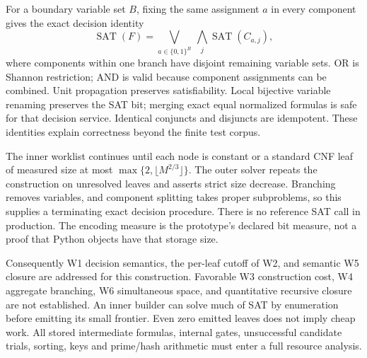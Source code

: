 \documentclass[11pt]{article}
\begin{document}
For a boundary variable set $B$, fixing the same assignment $a$ in every component
gives the exact decision identity
\[
\operatorname{SAT}(F)=
\bigvee_{a\in\{0,1\}^{B}}\ \bigwedge_j
\operatorname{SAT}(C_{a,j}),
\]
where components within one branch have disjoint remaining variable sets.
OR is Shannon restriction; AND is valid because component assignments can be
combined. Unit propagation preserves satisfiability. Local bijective variable
renaming preserves the SAT bit; merging exact equal normalized formulas is safe
for that decision service. Identical conjuncts and disjuncts are idempotent.
These identities explain correctness beyond the finite test corpus.

The inner worklist continues until each node is constant or a standard CNF leaf
of measured size at most $\max\{2,\lfloor M^{2/3}\rfloor\}$. The outer solver
repeats the construction on unresolved leaves and asserts strict size decrease.
Branching removes variables, and component splitting takes proper subproblems,
so this supplies a terminating exact decision procedure. There is no reference
SAT call in production. The encoding measure is the prototype's declared bit
measure, not a proof that Python objects have that storage size.

Consequently W1 decision semantics, the per-leaf cutoff of W2, and semantic W5
closure are addressed for this construction. Favorable W3 construction cost,
W4 aggregate branching, W6 simultaneous space, and quantitative recursive closure
are not established. An inner builder can solve much of SAT by enumeration before
emitting its small frontier. Even zero emitted leaves does not imply cheap work.
All stored intermediate formulas, internal gates, unsuccessful candidate trials,
sorting, keys and prime/hash arithmetic must enter a full resource analysis.
\end{document}
